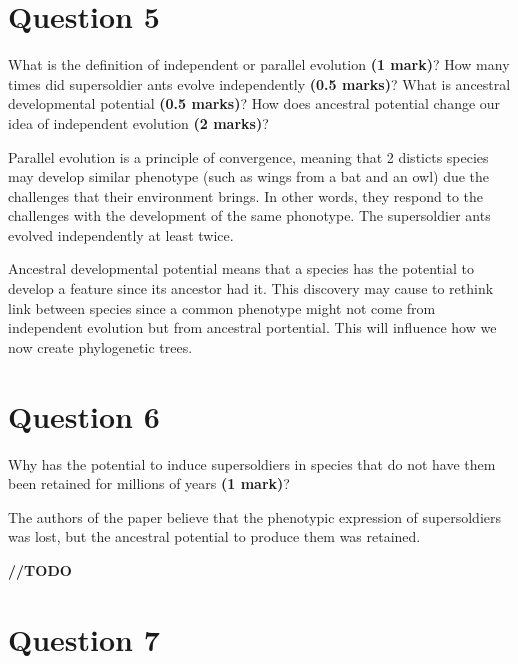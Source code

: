 \documentclass[letterpaper,12pt]{article}
\newenvironment{myindentpar}[1]%
{\begin{list}{}%
          {\setlength{\leftmargin}{#1}}%
          \item[]%
}
{\end{list}}
\begin{document}
\section*{Question 5}

What is the definition of independent or parallel evolution \textbf{(1 mark)}? How many times did supersoldier ants evolve independently \textbf{(0.5 marks)}? What is ancestral developmental potential \textbf{(0.5 marks)}? How does ancestral potential change our idea of independent evolution \textbf{(2 marks)}?
\vspace*{10px}

\begin{myindentpar}{0.5cm}
Parallel evolution is a principle of convergence, meaning that 2 disticts species may develop similar phenotype (such as wings from a bat and an owl) due the challenges that their environment brings. In other words, they respond to the challenges with the development of the same phonotype. The supersoldier ants evolved independently at least twice.

Ancestral developmental potential means that a species has the potential to develop a feature since its ancestor had it. This discovery may cause to rethink link between species since a common phenotype might not come from independent evolution but from ancestral portential. This will influence how we now create phylogenetic trees.
\end{myindentpar}


\section*{Question 6}

Why has the potential to induce supersoldiers in species that do not have them been retained for millions of years \textbf{(1 mark)}?
\vspace*{10px}

\begin{myindentpar}{0.5cm}
The authors of the paper believe that the phenotypic expression of supersoldiers was lost, but the ancestral potential to produce them was retained.

\color{red}\textbf{//TODO}
\end{myindentpar}



\section*{Question 7}
\end{document}

